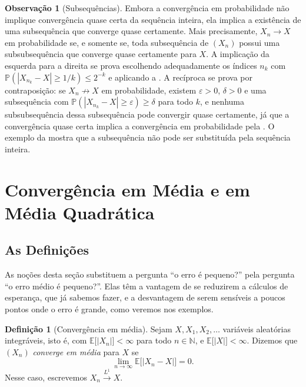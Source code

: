 \documentclass[12pt,portuguese]{article}
\theoremstyle{definition}
\newtheorem{definition}[definition]{Definição}
\newtheorem{remark}[remark]{Observação}
\theoremstyle{plainexercise}
\theoremstyle{starredexercise}
\theoremstyle{definition}
\begin{document}
\begin{remark}[Subsequências]\label{rem:subsequencias}
Embora a convergência em probabilidade não implique convergência quase certa da
sequência inteira, ela implica a existência de uma subsequência que converge
quase certamente. Mais precisamente, $X_n\to X$ em probabilidade se, e somente
se, toda subsequência de $(X_n)$ possui uma subsubsequência que converge quase
certamente para $X$.
A implicação da esquerda para a direita se prova escolhendo adequadamente os índices $n_k$ com
$\mathbb{P}(|X_{n_k}-X|\geqslant1/k)\leqslant2^{-k}$ e aplicando a
. A recíproca se prova por contraposição: se
$X_n\not\to X$ em probabilidade, existem $\varepsilon>0$, $\delta>0$ e uma
subsequência com $\mathbb{P}(|X_{n_k}-X|\geqslant\varepsilon)\geqslant\delta$
para todo $k$, e nenhuma subsubsequência dessa subsequência pode convergir quase
certamente, já que a convergência quase certa implica a convergência em
probabilidade pela . O exemplo da
 mostra que a subsequência não pode ser substituída pela
sequência inteira.
\end{remark}

\section{Convergência em Média e em Média Quadrática}\label{sec:medias}

\subsection{As Definições}\label{subsec:medias-definicoes}

As noções desta seção substituem a pergunta ``o erro é pequeno?'' pela pergunta
``o erro médio é pequeno?''. Elas têm a vantagem de se reduzirem a cálculos de
esperança, que já sabemos fazer, e a desvantagem de serem sensíveis a poucos
pontos onde o erro é grande, como veremos nos exemplos.

\begin{definition}[Convergência em média]\label{def:media}
Sejam $X,X_1,X_2,\ldots$ variáveis aleatórias integráveis, isto é, com
$\mathbb{E}\big[|X_n|\big]<\infty$ para todo $n\in\mathbb{N}$, e
$\mathbb{E}\big[|X|\big]<\infty$. Dizemos que
$(X_n)$ \emph{converge em média} para $X$ se
\[
\lim_{n\to\infty}\mathbb{E}\bigl[|X_n-X|\bigr]=0.
\]
Nesse caso, escrevemos $X_n\xrightarrow{L^1}X$.
\end{definition}
\end{document}
